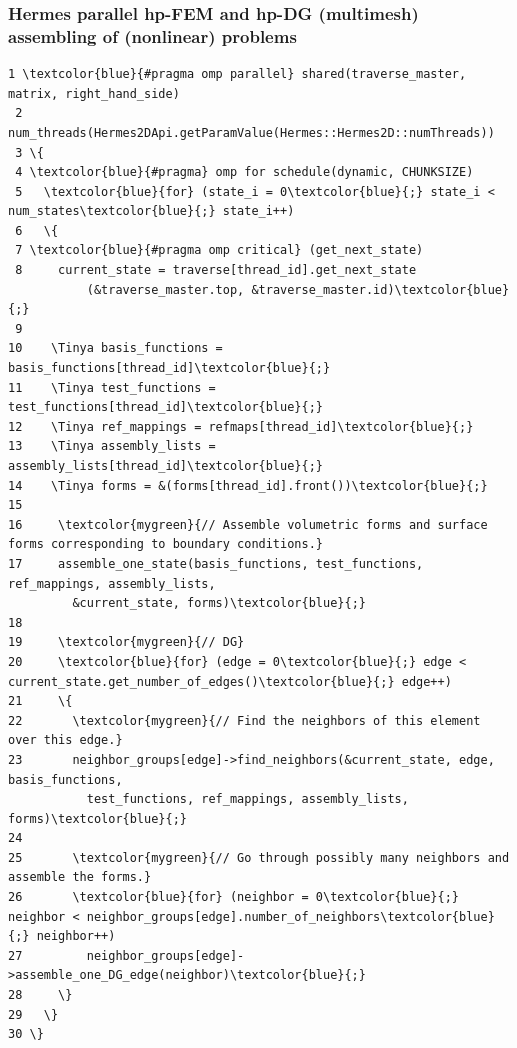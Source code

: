 \documentclass{beamer}
\begin{document}
\begin{frame}[fragile]
\frametitle{Hermes parallel hp-FEM and hp-DG (multimesh) assembling of (nonlinear) problems}
\begin{Verbatim}[commandchars=\\\{\}, fontsize=\Tiny]
 1 \textcolor{blue}{#pragma omp parallel} shared(traverse_master, matrix, right_hand_side)
 2 num_threads(Hermes2DApi.getParamValue(Hermes::Hermes2D::numThreads))
 3 \{
 4 \textcolor{blue}{#pragma} omp for schedule(dynamic, CHUNKSIZE)
 5   \textcolor{blue}{for} (state_i = 0\textcolor{blue}{;} state_i < num_states\textcolor{blue}{;} state_i++)
 6   \{
 7 \textcolor{blue}{#pragma omp critical} (get_next_state)
 8     current_state = traverse[thread_id].get_next_state
           (&traverse_master.top, &traverse_master.id)\textcolor{blue}{;}
 9
10    \Tinya basis_functions = basis_functions[thread_id]\textcolor{blue}{;}
11    \Tinya test_functions = test_functions[thread_id]\textcolor{blue}{;}
12    \Tinya ref_mappings = refmaps[thread_id]\textcolor{blue}{;}
13    \Tinya assembly_lists = assembly_lists[thread_id]\textcolor{blue}{;}
14    \Tinya forms = &(forms[thread_id].front())\textcolor{blue}{;}
15 
16     \textcolor{mygreen}{// Assemble volumetric forms and surface forms corresponding to boundary conditions.}
17     assemble_one_state(basis_functions, test_functions, ref_mappings, assembly_lists,
         &current_state, forms)\textcolor{blue}{;}
18 
19     \textcolor{mygreen}{// DG}
20     \textcolor{blue}{for} (edge = 0\textcolor{blue}{;} edge < current_state.get_number_of_edges()\textcolor{blue}{;} edge++)
21     \{
22       \textcolor{mygreen}{// Find the neighbors of this element over this edge.}
23       neighbor_groups[edge]->find_neighbors(&current_state, edge, basis_functions, 
           test_functions, ref_mappings, assembly_lists, forms)\textcolor{blue}{;}
24       
25       \textcolor{mygreen}{// Go through possibly many neighbors and assemble the forms.}
26       \textcolor{blue}{for} (neighbor = 0\textcolor{blue}{;} neighbor < neighbor_groups[edge].number_of_neighbors\textcolor{blue}{;} neighbor++)
27         neighbor_groups[edge]->assemble_one_DG_edge(neighbor)\textcolor{blue}{;}
28     \}
29   \}
30 \}
\end{Verbatim}
\end{frame}
\end{document}
